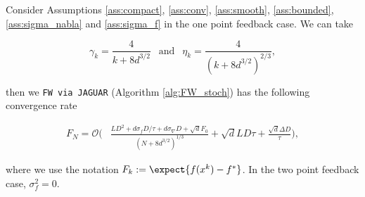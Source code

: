         \begin{theorem}
        \label{theorem:FW}
            Consider Assumptions \ref{ass:compact}, \ref{ass:conv},  \ref{ass:smooth}, \ref{ass:bounded}, \ref{ass:sigma_nabla} and \ref{ass:sigma_f} in the one point feedback case. We can take 
            
            $$\gamma_k = \frac{4}{k + 8d^{3/2}} ~~\text{ and }~~ \eta_k = \frac{4}{(k + 8d^{3/2})^{2/3}},$$
            
            then we \texttt{FW via JAGUAR} (Algorithm \ref{alg:FW_stoch}) has the following convergence rate
    
            \begin{equation*}
            \begin{split}
                F_N
                =
                \mathcal{O} \Bigg( &\frac{L D^2 + d \sigma_f D/ \tau + d\sigma_{\nabla} D + \sqrt{d} F_0}{(N + 8d^{3/2})^{1/3}}
                + \sqrt{d} L D \tau + \frac{\sqrt{d} \Delta D}{\tau}\Bigg),
            \end{split}
            \end{equation*}

            where we use the notation $F_k := \expect{f(x^{k}) - f^*}$. In the two point feedback case, $\sigma^2_f = 0$.
            
        \end{theorem}

